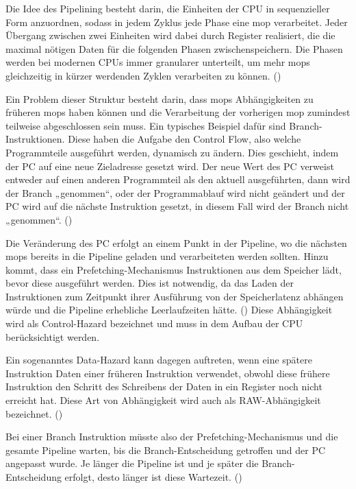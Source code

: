 Die Idee des Pipelining besteht darin, die Einheiten der
\ac{CPU} in sequenzieller Form anzuordnen, sodass in jedem
Zyklus jede Phase eine \ac{mop} verarbeitet. Jeder Übergang
zwischen zwei Einheiten wird dabei durch Register realisiert,
die die maximal nötigen Daten für die folgenden Phasen
zwischenspeichern. Die Phasen werden bei modernen \acp{CPU} immer
granularer unterteilt, um mehr \acp{mop} gleichzeitig in kürzer
werdenden Zyklen verarbeiten zu können.
(\cite[414-416]{sarangi_basic_2021})

Ein Problem dieser Struktur besteht darin, dass \acp{mop}
Abhängigkeiten zu früheren \acp{mop} haben können und die
Verarbeitung der vorherigen \ac{mop} zumindest teilweise
abgeschlossen sein muss. Ein typisches Beispiel dafür
sind Branch-Instruktionen. Diese haben die Aufgabe den Control
Flow, also welche Programmteile ausgeführt werden, dynamisch zu
ändern. Dies geschieht, indem der \ac{PC} auf eine neue
Zieladresse gesetzt wird. Der neue Wert des \ac{PC} verweist entweder
auf einen anderen Programmteil als den aktuell ausgeführten, dann
wird der Branch „genommen“, oder der Programmablauf wird nicht geändert
und der \ac{PC} wird auf die nächste Instruktion gesetzt, in diesem
Fall wird der Branch nicht „genommen“.
(\cite[31,34]{kaeli_speculative_2005})

Die Veränderung des \ac{PC} erfolgt an
einem Punkt in der Pipeline, wo die nächsten \acp{mop}
bereits in die Pipeline geladen und verarbeiteten werden sollten.
Hinzu kommt, dass ein Prefetching-Mechanismus Instruktionen aus
dem Speicher lädt, bevor diese ausgeführt werden.
Dies ist notwendig, da das Laden der Instruktionen zum Zeitpunkt
ihrer Ausführung von der Speicherlatenz abhängen würde und
die Pipeline erhebliche Leerlaufzeiten hätte.
(\cite[9-11]{kaeli_speculative_2005})
Diese Abhängigkeit wird als Control-Hazard bezeichnet und muss
in dem Aufbau der \ac{CPU} berücksichtigt werden.

Ein sogenanntes Data-Hazard kann dagegen auftreten, wenn eine
spätere Instruktion Daten einer früheren Instruktion verwendet,
obwohl diese frühere Instruktion den Schritt des Schreibens der
Daten in ein Register noch nicht erreicht hat. Diese Art von
Abhängigkeit wird auch als \ac{RAW}-Abhängigkeit bezeichnet.
(\cite[423-427]{sarangi_basic_2021})

Bei einer Branch Instruktion müsste also der
Prefetching-Mechanismus und die gesamte Pipeline warten, bis die
Branch-Entscheidung getroffen und der \ac{PC} angepasst wurde.
Je länger die Pipeline ist und je später die
Branch-Entscheidung erfolgt, desto länger ist diese Wartezeit.
(\cite[29-36]{kaeli_speculative_2005})

